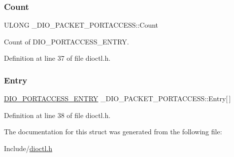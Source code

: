 \subsubsection{\texorpdfstring{Count}{Count}}
{\footnotesize\ttfamily U\+L\+O\+NG \+\_\+\+D\+I\+O\+\_\+\+P\+A\+C\+K\+E\+T\+\_\+\+P\+O\+R\+T\+A\+C\+C\+E\+S\+S\+::\+Count}



Count of D\+I\+O\+\_\+\+P\+O\+R\+T\+A\+C\+C\+E\+S\+S\+\_\+\+E\+N\+T\+RY. 



Definition at line 37 of file dioctl.\+h.

\mbox{\label{struct___d_i_o___p_a_c_k_e_t___p_o_r_t_a_c_c_e_s_s_a56311f42ddeea6e5e778e2e02f2e1ba4}} 
\subsubsection{\texorpdfstring{Entry}{Entry}}
{\footnotesize\ttfamily \mbox{\hyperlink{dioctl_8h_a2f0c3270029e69f24ab5023d93a1ab84}{D\+I\+O\+\_\+\+P\+O\+R\+T\+A\+C\+C\+E\+S\+S\+\_\+\+E\+N\+T\+RY}} \+\_\+\+D\+I\+O\+\_\+\+P\+A\+C\+K\+E\+T\+\_\+\+P\+O\+R\+T\+A\+C\+C\+E\+S\+S\+::\+Entry\mbox{[}$\,$\mbox{]}}



Definition at line 38 of file dioctl.\+h.



The documentation for this struct was generated from the following file\+:\begin{DoxyCompactItemize}
\item 
Include/\mbox{\hyperlink{dioctl_8h}{dioctl.\+h}}\end{DoxyCompactItemize}
